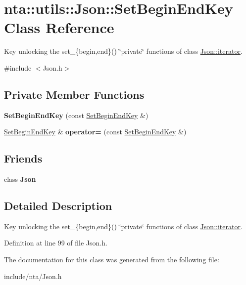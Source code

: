 \hypertarget{classnta_1_1utils_1_1Json_1_1SetBeginEndKey}{}\section{nta\+:\+:utils\+:\+:Json\+:\+:Set\+Begin\+End\+Key Class Reference}
\label{classnta_1_1utils_1_1Json_1_1SetBeginEndKey}


Key unlocking the set\+\_\+\{begin,end\}() \char`\"{}private\char`\"{} functions of class \hyperlink{classnta_1_1utils_1_1Json_1_1iterator}{Json\+::iterator}.  




{\ttfamily \#include $<$Json.\+h$>$}

\subsection*{Private Member Functions}
\begin{DoxyCompactItemize}
\item 
\mbox{\label{classnta_1_1utils_1_1Json_1_1SetBeginEndKey_a8b763786a663ac1f4480536569502b03}} 
{\bfseries Set\+Begin\+End\+Key} (const \hyperlink{classnta_1_1utils_1_1Json_1_1SetBeginEndKey}{Set\+Begin\+End\+Key} \&)
\item 
\mbox{\label{classnta_1_1utils_1_1Json_1_1SetBeginEndKey_acedfb4474597563556da2ae4df424e5e}} 
\hyperlink{classnta_1_1utils_1_1Json_1_1SetBeginEndKey}{Set\+Begin\+End\+Key} \& {\bfseries operator=} (const \hyperlink{classnta_1_1utils_1_1Json_1_1SetBeginEndKey}{Set\+Begin\+End\+Key} \&)
\end{DoxyCompactItemize}
\subsection*{Friends}
\begin{DoxyCompactItemize}
\item 
\mbox{\label{classnta_1_1utils_1_1Json_1_1SetBeginEndKey_a7dd8a79e9210a2a230d000eee63c6e8a}} 
class {\bfseries Json}
\end{DoxyCompactItemize}


\subsection{Detailed Description}
Key unlocking the set\+\_\+\{begin,end\}() \char`\"{}private\char`\"{} functions of class \hyperlink{classnta_1_1utils_1_1Json_1_1iterator}{Json\+::iterator}. 

Definition at line 99 of file Json.\+h.



The documentation for this class was generated from the following file\+:\begin{DoxyCompactItemize}
\item 
include/nta/Json.\+h\end{DoxyCompactItemize}
